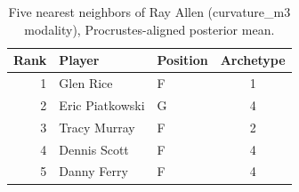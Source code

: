 \begin{table}[htbp]
  \centering\small
  \begin{tabular}{rllc}
    \toprule
    Rank & Player & Position & Archetype \\
    \midrule
    1 & Glen Rice & F & 1 \\
    2 & Eric Piatkowski & G & 4 \\
    3 & Tracy Murray & F & 2 \\
    4 & Dennis Scott & F & 4 \\
    5 & Danny Ferry & F & 4 \\
    \bottomrule
  \end{tabular}
  \caption{Five nearest neighbors of Ray Allen (curvature_m3 modality), Procrustes-aligned posterior mean.}
  \label{tab:Ray_Allen_neighbors_curvature_m3}
\end{table}

